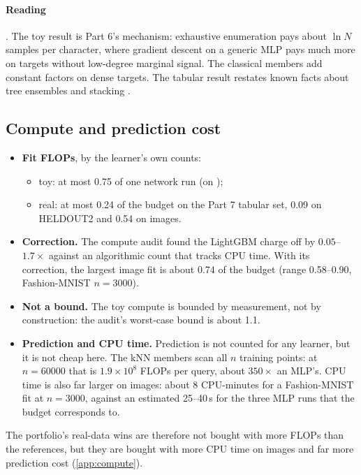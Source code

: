 \paragraph{Reading} . The toy result is Part 6's mechanism: exhaustive enumeration pays about $\ln N$ samples per character, where gradient descent on a generic MLP pays much more on targets without low-degree marginal signal. The classical members add constant factors on dense targets. The tabular result restates known facts about tree ensembles and stacking \cite{grinsztajn2022tree,erickson2020autogluon}.

\subsection{Compute and prediction cost}\label{sec:compute8}

\begin{itemize}
\item \textbf{Fit FLOPs}, by the learner's own counts:
  \begin{itemize}
  \item toy: at most 0.75 of one network run (on );
  \item real: at most 0.24 of the budget on the Part 7 tabular set, 0.09 on HELDOUT2 and 0.54 on images.
  \end{itemize}
\item \textbf{Correction.} The compute audit found the LightGBM charge off by $0.05$--$1.7\times$ against an algorithmic count that tracks CPU time. With its correction, the largest image fit is about 0.74 of the budget (range 0.58--0.90, Fashion-MNIST $n=3000$).
\item \textbf{Not a bound.} The toy compute is bounded by measurement, not by construction: the audit's worst-case bound is about 1.1.
\item \textbf{Prediction and CPU time.} Prediction is not counted for any learner, but it is not cheap here. The kNN members scan all $n$ training points: at $n=60000$ that is $1.9\times10^8$ FLOPs per query, about $350\times$ an MLP's. CPU time is also far larger on images: about 8 CPU-minutes for a Fashion-MNIST fit at $n=3000$, against an estimated 25--40\,s for the three MLP runs that the budget corresponds to.
\end{itemize}
The portfolio's real-data wins are therefore not bought with more FLOPs than the references, but they are bought with more CPU time on images and far more prediction cost (\cref{app:compute}).


